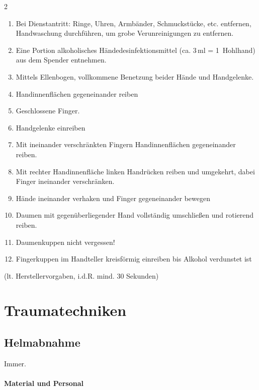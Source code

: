 \begin{gWideParEnv}
\begin{minipage}{\linewidth}
\begin{multicols}{2}
\begin{enumerate}
    \item Bei Dienstantritt: Ringe, Uhren, Armbänder,
    Schmuckstücke, etc. entfernen, Handwaschung
    durchführen, um grobe Verunreinigungen zu entfernen.
    \item Eine Portion alkoholisches
    Händedesinfektionsmittel (ca. 3\,ml = 1~Hohlhand) aus
    dem Spen\-der entnehmen.
    \item Mittels Ellenbogen, vollkommene Benetzung beider Hände und
    Handgelenke.
    \item Handinnenflächen gegeneinander reiben
    \item Geschlossene Finger.
    \item Handgelenke einreiben
    \item Mit ineinander verschränkten Fingern Handinnenflächen
    gegeneinander reiben.
    \item Mit rechter Handinnenfläche linken Handrücken reiben und
    umgekehrt, dabei Finger ineinander verschränken.
    \item Hände ineinander verhaken und Finger gegeneinander bewegen
    \item Daumen mit gegenüberliegender Hand vollständig umschließen
    und rotierend reiben.
    \item Daumenkuppen nicht vergessen!
    \item Fingerkuppen im Handteller kreisförmig einreiben bis Alkohol
    verdunstet ist
\end{enumerate}
 (lt. Herstellervorgaben, i.d.R. mind. 30 Sekunden) 
\end{multicols}
\end{minipage}
\end{gWideParEnv}

\nocite{KirschnickPflege2}



\section{Traumatechniken}

\subsection{Helmabnahme}
\label{topic:helmabnahme}

Immer.

\paragraph*{Material und Personal}~

